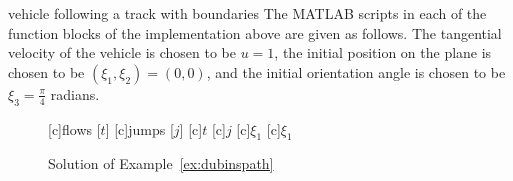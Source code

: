 \begin{example}{vehicle following a track with boundaries}
The MATLAB scripts in each of the function blocks of the implementation above are given as follows. The tangential velocity of the vehicle is chosen to be $u=1$, the initial position on the plane is chosen to be $(\xi_1,\xi_2)=(0,0)$, and the initial orientation angle is chosen to be $\xi_3=\frac{\pi}{4}$ radians.

%

\begin{figure}[ht]
  \centering
  [c]{flows [$t$]}
  [c]{jumps [$j$]}
  [c]{$t$}
  [c]{$j$}
  [c]{$\xi_1$}
  [c]{$\xi_1$}
\qquad
{}
   \caption{Solution of Example~\ref{ex:dubinspath}}
\end{figure}


\end{example}
